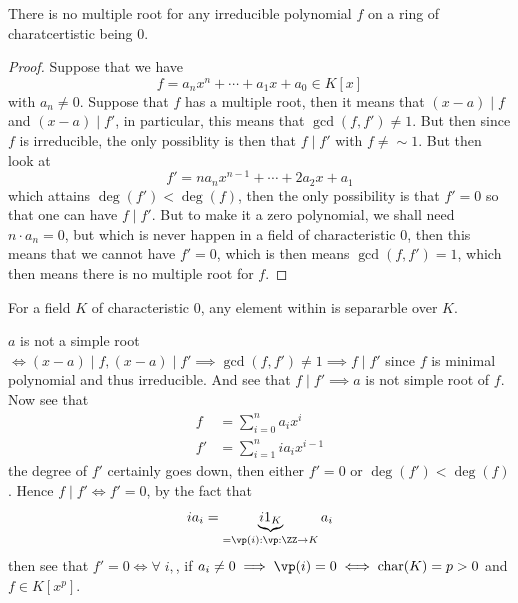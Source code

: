 \begin{proposition}
	There is no multiple root for any irreducible polynomial \( f \) on a ring of charatcertistic
	being \( 0 \).
\end{proposition}

\begin{proof}
	Suppose that we have
	\[
		f = a_n x^{n} + \cdots + a_1 x + a_0 \in K[x]
	\]
	with \( a_n \ne 0 \). Suppose that \( f \) has a multiple root, then it means that \( (x-a) \mid f \)
	and \( (x-a) \mid f' \), in particular, this means that \( \gcd(f, f') \ne 1 \). But then since \( f \) is irreducible,
	the only possiblity is then that \( f \mid f' \) with \( f \ne\sim 1 \). But then look at
	\[
		f' = n a_n x^{n-1} + \cdots + 2 a_2 x + a_1
	\]
	which attains \( \deg(f') < \deg(f) \), then the only possibility is that \( f'= 0 \) so that one
	can have \( f\mid f' \). But to make it a zero polynomial, we shall need \( n \cdot a_n = 0 \),
	but which is never happen in a field of characteristic \( 0 \), then this means that we cannot
	have \( f' = 0 \), which is then means \( \gcd(f,f') = 1 \), which then means there is no multiple
	root for \( f \).
\end{proof}

\begin{conclusion}
	For a field \( K \) of characteristic \( 0 \), any element within is separarble over \( K \).
\end{conclusion}

\begin{remark}
	\( a \) is not a simple root \( \iff (x-a)\mid f, (x-a)\mid f' \implies \gcd(f,f') \ne 1 \implies
	f\mid f'\) since \( f \) is minimal polynomial and thus irreducible. And see that \( f \mid f'
	\implies a \) is not simple root of \( f \). Now see that
	\begin{align*}
		f  & = \sum_{i=0 }^n a_i x^i    \\
		f' & =\sum_{i=1}^n ia_i x^{i-1}
	\end{align*}
	the degree of \( f' \) certainly goes down, then either \( f' = 0 \) or \( \deg(f') < \deg(f) \).
	Hence \( f\mid f' \iff f' = 0 \), by the fact that
	\[
		ia_i = \underbrace{i 1_K}_{=\vp(i) : \vp: \ZZ \to K} a_i
	\]
	then see that \( f'= 0 \iff \forall\; i,  \), if \( a_i \ne 0 \implies \vp(i) = 0 \iff \text{char}(K) = p > 0
	\) and \( f \in K[x^p] \).
\end{remark}

